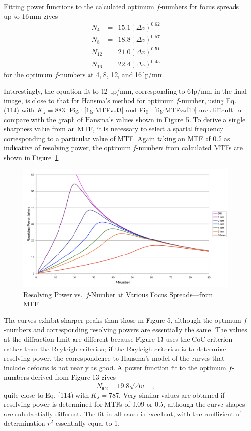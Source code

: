 \documentclass[11pt, oneside]{scrartcl}   	%
\newcommand{\Dv}{\ensuremath{\Delta v}}
\begin{document}
Fitting power functions to the calculated optimum $f$-numbers for focus spreads up to 16\,mm gives
\begin{eqnarray}
N_4 &=&15.1(\Dv)^{0.62}\\
N_8 &=&18.8(\Dv)^{0.57}\\
N_{12} &=&21.0(\Dv)^{0.51}\\
N_{16} &=&22.4(\Dv)^{0.45}
\end{eqnarray}
for the optimum $f$-numbers at 4, 8, 12, and 16\,lp/mm.

Interestingly, the equation fit to 12 \,lp/mm, corresponding to 6\,lp/mm in the final image,
is close to that for Hansma’s method for optimum $f$-number, using Eq. (114) with $K_\lambda = 883$. Fig.~\ref{fig:MTFvsf3} and Fig.~\ref{fig:MTFvsf10} are difficult to compare with the graph of Hansma’s values shown in Figure 5. To derive a single sharpness value from an MTF, it is necessary to select a spatial frequency corresponding to a particular value of MTF. Again taking an MTF of 0.2 as indicative of resolving power, the optimum $f$-numbers from calculated MTFs are shown in Figure~\ref{fig:respow}.

\begin{figure}[htbp] %
   \centering
   \includegraphics[width=\linewidth]{figure/fig_dofd_13} 
   \caption{Resolving Power vs.\ $f$-Number at Various Focus Spreads---from MTF}
   \label{fig:respow}
\end{figure}%

The curves exhibit sharper peaks than those in Figure 5, although the optimum $f$-numbers and corresponding resolving powers are essentially the same. The values at the diffraction limit are different because Figure 13 uses the CoC criterion rather than the Rayleigh criterion; if the Rayleigh criterion is to determine resolving power, the correspondence to Hansma’s model of the curves that include defocus is not nearly as good. A power function fit to the optimum $f$-numbers derived from Figure 13 gives
\begin{equation}
N_{0.2} = 19.8\sqrt{\Dv}\quad,
\end{equation}
quite close to Eq. (114) with $K_\lambda = 787$. Very similar values are obtained if resolving power is determined for MTFs of 0.09 or 0.5, although the curve shapes are substantially different. The fit in all cases is excellent, with the coefficient of determination $r^2$ essentially equal to 1.
\end{document}
